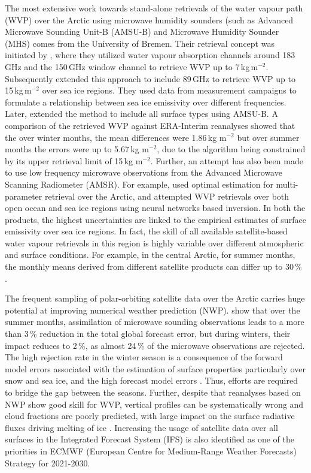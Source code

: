 \documentclass[12pt,oneside,a4paper]{article}
\begin{document}
The most extensive work towards stand-alone retrievals of the water vapour path
(WVP) over the Arctic using microwave humidity sounders (such as Advanced
Microwave Sounding Unit-B (AMSU-B) and Microwave Humidity Sounder (MHS) comes
from the University of Bremen. Their retrieval concept was initiated by
\citet{miao:2001:atmos}, where they utilized water vapour absorption channels
around 183\,GHz and the 150\,GHz window channel to retrieve WVP up to 7\,kg\,m$^{-2}$. Subsequently \citet{melsheimer:2008:impro} extended this approach to
include 89\,GHz to retrieve WVP up to 15\,kg\,m$^{-2}$ over sea ice regions.
They used data from measurement campaigns to formulate a relationship between
sea ice emissivity over different frequencies. Later,
\citet{scarlat:2018:retri} extended the method to include all surface types
using AMSU-B. A comparison of the retrieved WVP against ERA-Interim reanalyses
showed that the over winter months, the mean differences were 1.86\,kg m$^{-2}$
but over summer months the errors were up to 5.67\,kg m$^{-2}$, due to the
algorithm being constrained by its upper retrieval limit of 15\,kg m$^{-2}$.
Further, an attempt has also been made to use low frequency microwave
observations from the Advanced Microwave Scanning Radiometer (AMSR). For example,
\citet{scarlat:2017:exper} used optimal estimation for multi-parameter retrieval
over the Arctic, and \citet{zabolotskikh:2020:anadv} attempted WVP retrievals over
both open ocean and sea ice regions using neural networks based inversion. In
both the products, the highest uncertainties are linked to the empirical
estimates of surface emissivity over sea ice regions. In fact, the skill of all
available satellite-based water vapour retrievals in this region is highly
variable over different atmospheric and surface conditions. For example, in the
central Arctic, for summer months, the monthly means derived from different
satellite products can differ up to 30\,\% \citep{crewell:2021:asyst}.

The frequent sampling of polar-orbiting satellite data over the Arctic carries
huge potential at improving numerical weather prediction (NWP).
\citet{lawrence:2019:usean} show that over the summer months, assimilation of
microwave sounding observations leads to a more than 3\,\% reduction in the total
global forecast error, but during winters, their impact reduces to 2\,\%, as
almost 24\,\% of the microwave observations are rejected. The high rejection rate
in the winter season is a consequence of the forward model errors associated
with the estimation of surface properties particularly over snow and sea ice,
and the high forecast model errors \citep{bauer:2016:aspec}. Thus, efforts are
required to bridge the gap between the seasons. Further, despite that
reanalyses based on NWP show good skill for WVP, vertical profiles can be
systematically wrong and cloud fractions are poorly predicted, with large
impact on the surface radiative fluxes driving melting of ice
\citep{graham:2019:evalu}. Increasing the usage of satellite data over all
surfaces in the Integrated Forecast System (IFS) is also identified as one of the
priorities in ECMWF (European Centre for Medium-Range Weather Forecasts)
Strategy for 2021-2030.
\end{document}
